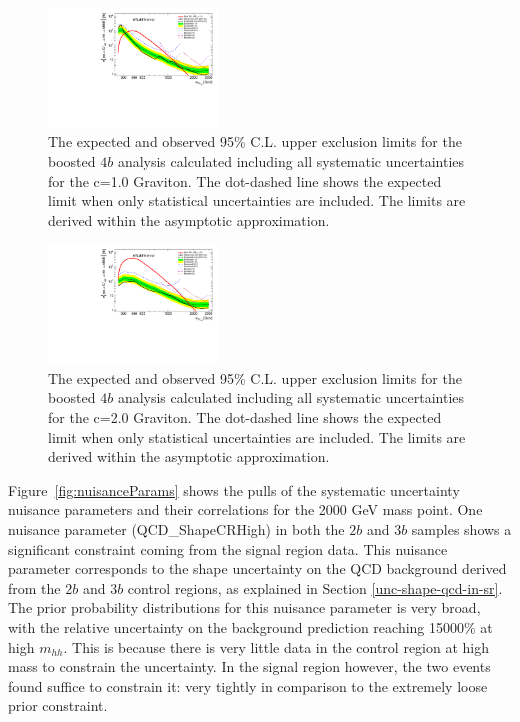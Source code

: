 \begin{figure}
\begin{center}
\includegraphics[width=0.4\textwidth,angle=-90]{figures/boosted/results/BrazilPlot_Asymptotic_g_hh_c10_combined_AllSyst_unblinded_2017-10-04.pdf}
\caption{The expected and observed 95\% C.L. upper exclusion limits for the boosted $4b$ analysis calculated including all systematic uncertainties for the c=1.0 Graviton. The dot-dashed line shows the expected limit when only statistical uncertainties are included. The limits are derived within the asymptotic approximation.}
\label{fig:limit_scalar}
\end{center}
\end{figure}
\begin{figure}

\begin{center}
\includegraphics[width=0.4\textwidth,angle=-90]{figures/boosted/results/BrazilPlot_Asymptotic_g_hh_c20_combined_AllSyst_unblinded_2017-10-09.pdf}
\caption{The expected and observed 95\% C.L. upper exclusion limits for the boosted $4b$ analysis calculated including all systematic uncertainties for the c=2.0 Graviton. The dot-dashed line shows the expected limit when only statistical uncertainties are included. The limits are derived within the asymptotic approximation.}
\label{fig:limit_scalar}
\end{center}
\end{figure}

Figure~\ref{fig:nuisanceParams} shows the pulls of the systematic uncertainty nuisance parameters and their correlations for the 2000 GeV mass point. One nuisance parameter (QCD\_ShapeCRHigh) in both the $2b$ and $3b$ samples shows a significant constraint coming from the signal region data. This nuisance parameter corresponds to the shape uncertainty on the QCD background derived from the $2b$ and $3b$ control regions, as explained in Section \ref{unc-shape-qcd-in-sr}. The prior probability distributions for this nuisance parameter is very broad, with the relative uncertainty on the background prediction reaching 15000\% at high $m_{hh}$. This is because there is very little data in the control region at high mass to constrain the uncertainty. In the signal region however, the two events found suffice to constrain it: very tightly in comparison to the extremely loose prior constraint.

